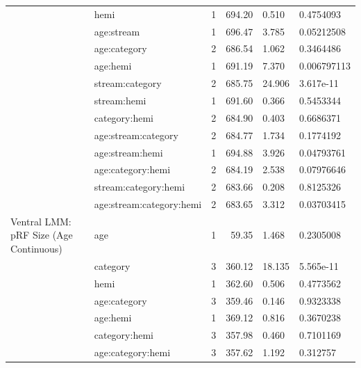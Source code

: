 \begin{table}
\begin{tabular}{llrrll}
\addlinespace
 & hemi & 1 & 694.20 & 0.510 & 0.4754093\\
 & age:stream & 1 & 696.47 & 3.785 & 0.05212508\\
 & age:category & 2 & 686.54 & 1.062 & 0.3464486\\
 & age:hemi & 1 & 691.19 & 7.370 & 0.006797113\\
 & stream:category & 2 & 685.75 & 24.906 & 3.617e-11\\
\addlinespace
 & stream:hemi & 1 & 691.60 & 0.366 & 0.5453344\\
 & category:hemi & 2 & 684.90 & 0.403 & 0.6686371\\
 & age:stream:category & 2 & 684.77 & 1.734 & 0.1774192\\
 & age:stream:hemi & 1 & 694.88 & 3.926 & 0.04793761\\
 & age:category:hemi & 2 & 684.19 & 2.538 & 0.07976646\\
\addlinespace
 & stream:category:hemi & 2 & 683.66 & 0.208 & 0.8125326\\
 & age:stream:category:hemi & 2 & 683.65 & 3.312 & 0.03703415\\
Ventral LMM: pRF Size (Age Continuous) & age & 1 & 59.35 & 1.468 & 0.2305008\\
 & category & 3 & 360.12 & 18.135 & 5.565e-11\\
 & hemi & 1 & 362.60 & 0.506 & 0.4773562\\
\addlinespace
 & age:category & 3 & 359.46 & 0.146 & 0.9323338\\
 & age:hemi & 1 & 369.12 & 0.816 & 0.3670238\\
 & category:hemi & 3 & 357.98 & 0.460 & 0.7101169\\
 & age:category:hemi & 3 & 357.62 & 1.192 & 0.312757\\
\bottomrule
\end{tabular}
\end{table}
